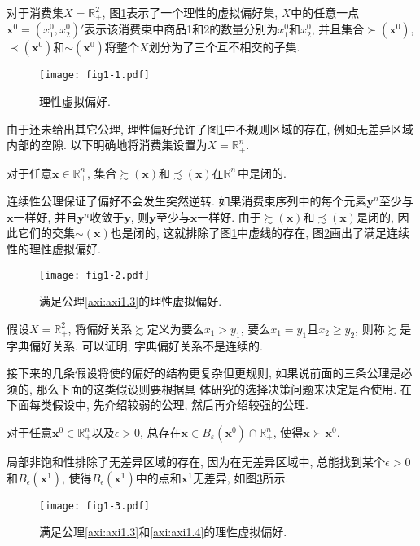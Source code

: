 \documentclass[cn, 12pt, math=mtpro2, bibstyle=apa, blue, twocol]{elegantbook}
\newcommand{\R}{\mathbb{R}}
\newcommand{\x}{\mathbf{x}}
\begin{document}
对于消费集$X=\R_+^2$, 图\ref{fig1.1}表示了一个理性的虚拟偏好集, $X$中的任意一点$\x^0=(x_1^0,x_2^0)'$表示该消费束中商品1和2的数量分别为$x_1^0$和$x_2^0$, 并且集合$\succ(\x^0)$, $\prec(\x^0)$和$\sim(\x^0)$将整个$X$划分为了三个互不相交的子集.
\begin{figure}
  \centering
  \texttt{[image: fig1-1.pdf]}
  \caption{理性虚拟偏好.}\label{fig1.1}
\end{figure}

由于还未给出其它公理, 理性偏好允许了图\ref{fig1.1}中不规则区域的存在, 例如无差异区域内部的空隙. 以下明确地将消费集设置为$X=\R^n_+$.

\begin{axiom}[连续性]\label{axi:axi1.3}
对于任意$\x\in\R^n_+$, 集合$\succsim(\x)$和$\precsim(\x)$在$\R_+^n$中是闭的.
\end{axiom}
连续性公理保证了偏好不会发生突然逆转. 如果消费束序列中的每个元素$\mathbf{y}^n$至少与$\x$一样好, 并且$\mathbf{y}^n$收敛于$\mathbf{y}$, 则$\mathbf{y}$至少与$\x$一样好. 由于$\succsim(\x)$和$\precsim(\x)$是闭的, 因此它们的交集$\sim(\x)$也是闭的, 这就排除了图\ref{fig1.1}中虚线的存在, 图\ref{fig1.2}画出了满足连续性的理性虚拟偏好.

\begin{figure}[htbp!]
  \centering
  \texttt{[image: fig1-2.pdf]}
  \caption{满足公理\ref{axi:axi1.3}的理性虚拟偏好.}\label{fig1.2}
\end{figure}

\begin{example}[字典偏好关系]
假设$X=\R_+^2$, 将偏好关系$\succsim$定义为要么$x_1>y_1$, 要么$x_1=y_1$且$x_2\ge y_2$, 则称$\succsim$是字典偏好关系. 可以证明, 字典偏好关系不是连续的.
\end{example}

接下来的几条假设将使的偏好的结构更复杂但更规则, 如果说前面的三条公理是必须的, 那么下面的这类假设则要根据具 体研究的选择决策问题来决定是否使用. 在下面每类假设中, 先介绍较弱的公理, 然后再介绍较强的公理.

\begin{axiom}[局部非饱和性]\label{axi:axi1.4}
对于任意$\x^0\in\R^n_+$以及$\epsilon>0$, 总存在$\x\in B_\varepsilon(\x^0)\cap \R_+^n$, 使得$\x\succ\x^0$.
\end{axiom}
局部非饱和性排除了无差异区域的存在, 因为在无差异区域中, 总能找到某个$\epsilon>0$和$B_\epsilon(\x^1)$, 使得$B_\epsilon(\x^1)$中的点和$\x^1$无差异, 如图\ref{fig1.3}所示.
\begin{figure}
  \centering
  \texttt{[image: fig1-3.pdf]}
  \caption{满足公理\ref{axi:axi1.3}和\ref{axi:axi1.4}的理性虚拟偏好.}\label{fig1.3}
\end{figure}
\end{document}
